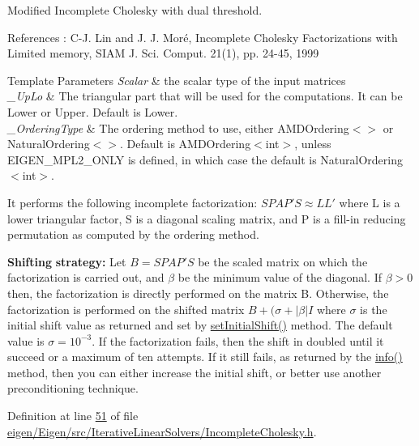 Modified Incomplete Cholesky with dual threshold. 

References \+: C-\/J. Lin and J. J. Moré, Incomplete Cholesky Factorizations with Limited memory, S\+I\+AM J. Sci. Comput. 21(1), pp. 24-\/45, 1999


\begin{DoxyTemplParams}{Template Parameters}
{\em Scalar} & the scalar type of the input matrices \\
\hline
{\em \+\_\+\+Up\+Lo} & The triangular part that will be used for the computations. It can be Lower or Upper. Default is Lower. \\
\hline
{\em \+\_\+\+Ordering\+Type} & The ordering method to use, either A\+M\+D\+Ordering$<$$>$ or Natural\+Ordering$<$$>$. Default is A\+M\+D\+Ordering$<$int$>$, unless E\+I\+G\+E\+N\+\_\+\+M\+P\+L2\+\_\+\+O\+N\+LY is defined, in which case the default is Natural\+Ordering$<$int$>$.\\
\hline
\end{DoxyTemplParams}


It performs the following incomplete factorization\+: $ S P A P' S \approx L L' $ where L is a lower triangular factor, S is a diagonal scaling matrix, and P is a fill-\/in reducing permutation as computed by the ordering method.

{\bfseries Shifting} {\bfseries strategy\+:} Let $ B = S P A P' S $ be the scaled matrix on which the factorization is carried out, and $ \beta $ be the minimum value of the diagonal. If $ \beta > 0 $ then, the factorization is directly performed on the matrix B. Otherwise, the factorization is performed on the shifted matrix $ B + (\sigma+|\beta| I $ where $ \sigma $ is the initial shift value as returned and set by \hyperlink{class_eigen_1_1_incomplete_cholesky_a409c9586e7d29566dda2c8f5e38a1228}{set\+Initial\+Shift()} method. The default value is $ \sigma = 10^{-3} $. If the factorization fails, then the shift in doubled until it succeed or a maximum of ten attempts. If it still fails, as returned by the \hyperlink{class_eigen_1_1_incomplete_cholesky_ada0e68cb22601849464506f5986a88c1}{info()} method, then you can either increase the initial shift, or better use another preconditioning technique. 

Definition at line \hyperlink{eigen_2_eigen_2src_2_iterative_linear_solvers_2_incomplete_cholesky_8h_source_l00051}{51} of file \hyperlink{eigen_2_eigen_2src_2_iterative_linear_solvers_2_incomplete_cholesky_8h_source}{eigen/\+Eigen/src/\+Iterative\+Linear\+Solvers/\+Incomplete\+Cholesky.\+h}.



